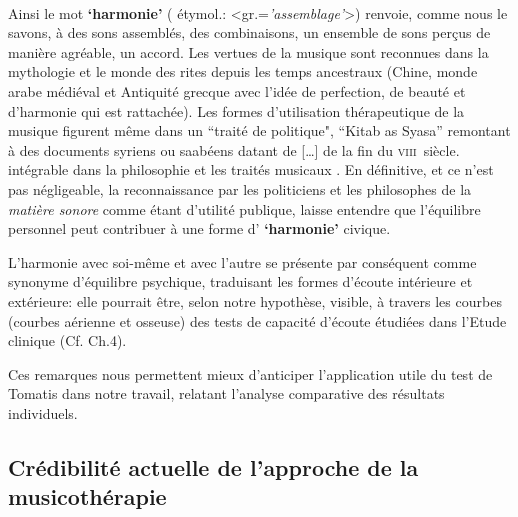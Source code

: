 \paragraph{}
Ainsi le mot \textbf{`harmonie'} ( étymol.:
<gr.=\textit{'assemblage'}>) renvoie, comme nous le savons, à
 des sons assemblés, des combinaisons, un ensemble de sons perçus de
 manière agréable, un accord.
Les vertues de la musique sont reconnues dans la mythologie et le
monde des rites depuis les temps ancestraux (Chine, monde arabe
médiéval et Antiquité grecque avec l'idée de perfection, de beauté et d'harmonie  qui est rattachée).
Les formes d'utilisation
thérapeutique de la musique figurent même dans un ``traité de politique",
``Kitab as Syasa'' remontant à des documents syriens ou saabéens datant de  [\dots] de la fin du
\textsc{viii}\ieme\ siècle.   intégrable dans la
philosophie et les traités musicaux \autocite[ch. III, p.
96]{vrait_musicotherapie_2018}.
En définitive, et ce n'est pas négligeable, la reconnaissance par les  politiciens  et les
philosophes de la \textit{matière sonore} comme étant d'utilité
publique, laisse entendre que l'équilibre personnel
peut contribuer à une forme d' \textbf{`harmonie'} civique.


L'harmonie avec soi-même et avec l'autre se présente par conséquent comme synonyme d'équilibre
psychique, traduisant les formes d'écoute intérieure et
extérieure: elle pourrait être, selon notre hypothèse, visible,
 à travers les courbes (courbes aérienne et osseuse) des tests de capacité d'écoute étudiées
dans l'Etude clinique (Cf. Ch.4).

Ces remarques nous permettent mieux d'anticiper
l'application utile du test de Tomatis dans notre travail, relatant l'analyse
comparative des résultats individuels.


\subsection{Crédibilité actuelle de l'approche de la musicothérapie }


